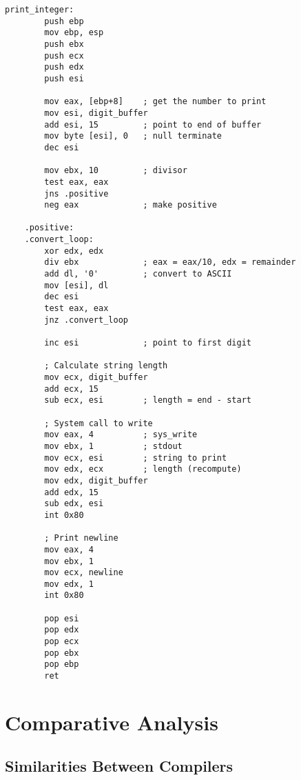 \documentclass[12pt,a4paper]{article}
\begin{document}
\begin{lstlisting}[caption={Runtime I/O Function Example (write\_print\_integer)}]
print_integer:
        push ebp
        mov ebp, esp
        push ebx
        push ecx
        push edx
        push esi
        
        mov eax, [ebp+8]    ; get the number to print
        mov esi, digit_buffer
        add esi, 15         ; point to end of buffer
        mov byte [esi], 0   ; null terminate
        dec esi
        
        mov ebx, 10         ; divisor
        test eax, eax
        jns .positive
        neg eax             ; make positive
        
    .positive:
    .convert_loop:
        xor edx, edx
        div ebx             ; eax = eax/10, edx = remainder
        add dl, '0'         ; convert to ASCII
        mov [esi], dl
        dec esi
        test eax, eax
        jnz .convert_loop
        
        inc esi             ; point to first digit
        
        ; Calculate string length
        mov ecx, digit_buffer
        add ecx, 15
        sub ecx, esi        ; length = end - start
        
        ; System call to write
        mov eax, 4          ; sys_write
        mov ebx, 1          ; stdout
        mov ecx, esi        ; string to print
        mov edx, ecx        ; length (recompute)
        mov edx, digit_buffer
        add edx, 15
        sub edx, esi
        int 0x80
        
        ; Print newline
        mov eax, 4
        mov ebx, 1
        mov ecx, newline
        mov edx, 1
        int 0x80
        
        pop esi
        pop edx
        pop ecx
        pop ebx
        pop ebp
        ret

\end{lstlisting}

\section{Comparative Analysis}

\subsection{Similarities Between Compilers}
\end{document}
